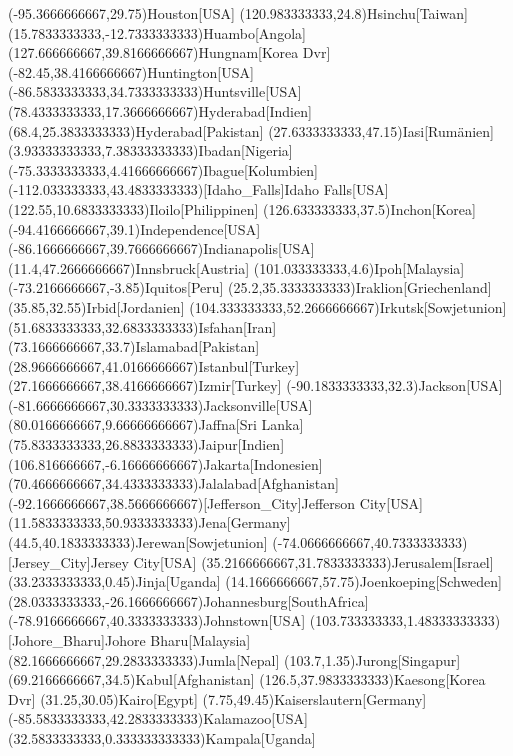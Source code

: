 \mapput(-95.3666666667,29.75){Houston}[USA]
\mapput(120.983333333,24.8){Hsinchu}[Taiwan]
\mapput(15.7833333333,-12.7333333333){Huambo}[Angola]
\mapput(127.666666667,39.8166666667){Hungnam}[Korea Dvr]
\mapput(-82.45,38.4166666667){Huntington}[USA]
\mapput(-86.5833333333,34.7333333333){Huntsville}[USA]
\mapput(78.4333333333,17.3666666667){Hyderabad}[Indien]
\mapput(68.4,25.3833333333){Hyderabad}[Pakistan]
\mapput(27.6333333333,47.15){Iasi}[Rumänien]
\mapput(3.93333333333,7.38333333333){Ibadan}[Nigeria]
\mapput(-75.3333333333,4.41666666667){Ibague}[Kolumbien]
\mapput(-112.033333333,43.4833333333)[Idaho_Falls]{Idaho Falls}[USA]
\mapput(122.55,10.6833333333){Iloilo}[Philippinen]
\mapput(126.633333333,37.5){Inchon}[Korea]
\mapput(-94.4166666667,39.1){Independence}[USA]
\mapput(-86.1666666667,39.7666666667){Indianapolis}[USA]
\mapput(11.4,47.2666666667){Innsbruck}[Austria]
\mapput(101.033333333,4.6){Ipoh}[Malaysia]
\mapput(-73.2166666667,-3.85){Iquitos}[Peru]
\mapput(25.2,35.3333333333){Iraklion}[Griechenland]
\mapput(35.85,32.55){Irbid}[Jordanien]
\mapput(104.333333333,52.2666666667){Irkutsk}[Sowjetunion]
\mapput(51.6833333333,32.6833333333){Isfahan}[Iran]
\mapput(73.1666666667,33.7){Islamabad}[Pakistan]
\mapput(28.9666666667,41.0166666667){Istanbul}[Turkey]
\mapput(27.1666666667,38.4166666667){Izmir}[Turkey]
\mapput(-90.1833333333,32.3){Jackson}[USA]
\mapput(-81.6666666667,30.3333333333){Jacksonville}[USA]
\mapput(80.0166666667,9.66666666667){Jaffna}[Sri Lanka]
\mapput(75.8333333333,26.8833333333){Jaipur}[Indien]
\mapput(106.816666667,-6.16666666667){Jakarta}[Indonesien]
\mapput(70.4666666667,34.4333333333){Jalalabad}[Afghanistan]
\mapput(-92.1666666667,38.5666666667)[Jefferson_City]{Jefferson City}[USA]
\mapput(11.5833333333,50.9333333333){Jena}[Germany]
\mapput(44.5,40.1833333333){Jerewan}[Sowjetunion]
\mapput(-74.0666666667,40.7333333333)[Jersey_City]{Jersey City}[USA]
\mapput(35.2166666667,31.7833333333){Jerusalem}[Israel]
\mapput(33.2333333333,0.45){Jinja}[Uganda]
\mapput(14.1666666667,57.75){Joenkoeping}[Schweden]
\mapput(28.0333333333,-26.1666666667){Johannesburg}[SouthAfrica]
\mapput(-78.9166666667,40.3333333333){Johnstown}[USA]
\mapput(103.733333333,1.48333333333)[Johore_Bharu]{Johore Bharu}[Malaysia]
\mapput(82.1666666667,29.2833333333){Jumla}[Nepal]
\mapput(103.7,1.35){Jurong}[Singapur]
\mapput(69.2166666667,34.5){Kabul}[Afghanistan]
\mapput(126.5,37.9833333333){Kaesong}[Korea Dvr]
\mapput(31.25,30.05){Kairo}[Egypt]
\mapput(7.75,49.45){Kaiserslautern}[Germany]
\mapput(-85.5833333333,42.2833333333){Kalamazoo}[USA]
\mapput(32.5833333333,0.333333333333){Kampala}[Uganda]
